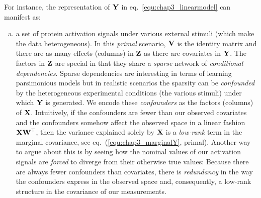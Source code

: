       For instance, the representation of $\mathbf{Y}$ in eq.~\eqref{equ:chap3_linearmodel} can manifest as:
      \begin{enumerate}[(a)]
	\item \label{item:scenario1}
	  a set of protein activation signals under various external stimuli (which make the data heterogeneous). In this \emph{primal} scenario, $\mathbf{V}$ is the identity matrix and there are as many effects (columns) in $\mathbf{Z}$ as there are covariates in $\mathbf{Y}$. The factors in $\mathbf{Z}$ are special in that they share a \emph{sparse} network of \emph{conditional dependencies}. Sparse dependencies are interesting in terms of learning parsimonious models but in realistic scenarios the sparsity can be \emph{confounded} by the heterogeneous experimental conditions (the various stimuli) under which $\mathbf{Y}$ is generated. We encode these \emph{confounders} as the factors (columns) of $\mathbf{X}$. Intuitively, if the confounders are fewer than our observed covariates and the confounders somehow affect the observed space in a linear fashion $\mathbf{X}\mathbf{W}^\top$, then the variance explained solely by $\mathbf{X}$ is a \emph{low-rank} term in the marginal covariance, see eq.~(\ref{equ:chap3_marginalY}, primal). Another way to 
argue about this is by seeing how the nominal values of our activation signals are \emph{forced} to diverge from their otherwise true values: Because there are always fewer confounders than covariates, there is \emph{redundancy} in the way the confounders express in the observed space and, consequently, a low-rank structure in the covariance of our measurements.


\end{enumerate}
